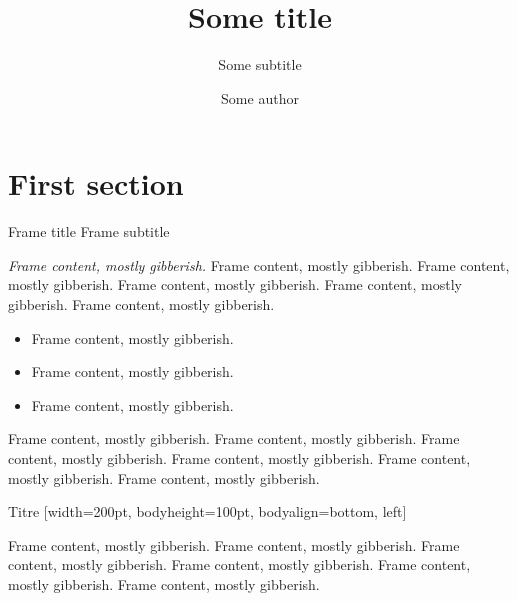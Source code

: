 \documentclass[9pt]{beamer}
\begin{document}
\title{Some title}
\subtitle{Some subtitle}

\author{Some author}

\maketitle


\section{First section}

\begin{frame}
  {Frame title}
  {Frame subtitle}

  \begingroup
    \emph{Frame content, mostly gibberish.} Frame content, mostly
    gibberish. Frame content, mostly gibberish. Frame content, mostly
    gibberish. Frame content, mostly gibberish. Frame content, mostly
    gibberish.
  \endgroup

  \vskip10pt
  \begin{block}{}
    \begin{itemize}
    \item Frame content, mostly gibberish.
    \item Frame content, mostly gibberish.
    \item Frame content, mostly gibberish.
    \end{itemize}
  \end{block}

  \vskip10pt%
  \begin{framedtext}%
    [offset=8pt, tikzoptions={draw=darkorange, very thick,
                              rounded corners=2pt}]%
    Frame content, mostly gibberish. Frame content, mostly gibberish.
    Frame content, mostly gibberish. Frame content, mostly gibberish.
    Frame content, mostly gibberish. Frame content, mostly gibberish.
  \end{framedtext}

  \vskip10pt
  \begin{center}
    \leavevmode
    \hfil
  \end{center}

\end{frame}

\begin{frame}

  \begin{block}{Titre}
    [width=200pt, bodyheight=100pt, bodyalign={bottom, left}]

    Frame content, mostly gibberish. Frame content, mostly gibberish.
    Frame content, mostly gibberish. Frame content, mostly gibberish.
    Frame content, mostly gibberish. Frame content, mostly gibberish.
  \end{block}

\end{frame}
\end{document}
